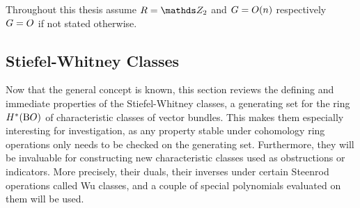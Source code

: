 \begin{Not}
  Throughout this thesis assume $R=\Zmod2$ and $G=O(n)$
  respectively $G=O$ if not stated otherwise.
\end{Not}

\subsection{Stiefel-Whitney Classes}
\label{sec:swclasses}
Now that the general concept is known, this section reviews the
defining and immediate properties of the Stiefel-Whitney
classes, a generating set for the ring $H^*(\mathrm{B}O)$ of characteristic
classes of vector bundles.
This makes them especially interesting for investigation,
as any property stable under cohomology ring operations only needs to
be checked on the generating set.
Furthermore, they will be invaluable for constructing new
characteristic classes used as obstructions or indicators.
More precisely, their duals, their inverses under certain Steenrod
operations called Wu classes, and a couple of special polynomials
evaluated on them will be used.

